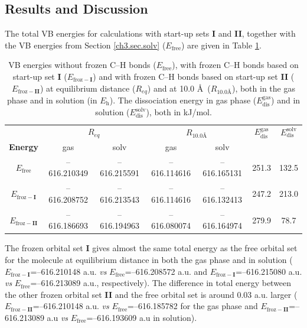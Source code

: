 \subsection{\label{ch3.sec.res.freez}Results and Discussion}

The total VB energies for calculations with start-up sets \textbf{I} and \textbf{II}, together with the VB energies from Section \ref{ch3.sec.solv} ($E_\mathrm{free}$) are given in Table \ref{ch3.tab.frozen}. 
\begin{table}[htp]
\center
\caption{VB energies without frozen C--H bonds ($E_\mathrm{free}$), with frozen C--H bonds based on
start-up set \textbf{I} ($E_\mathrm{froz-\textbf{I}}$) and with frozen C--H bonds based on start-up set \textbf{II}
($E_\mathrm{froz-\textbf{II}}$) at equilibrium distance ($R_{eq}$) and at 10.0 \AA\ ($R_{10.0 \text{\AA}}$),
both in the gas phase and in solution (in $E_\mathrm{h}$). The dissociation energy in gas phase ($E_\mathrm{dis}^\mathrm{gas}$) and in solution ($E_\mathrm{dis}^\mathrm{solv}$), both in kJ/mol.}
\center
\begin{tabular}{|c|cc|cc|c|c|}
\hline
&\multicolumn{2}{c|}{$R_{eq}$}&\multicolumn{2}{c|}{$R_{10.0 \text{\AA}}$} & $E_\mathrm{dis}^\mathrm{gas}$ & $E_\mathrm{dis}^\mathrm{solv}$ \\
\textbf{Energy} & gas & solv & gas & solv &  & \\
\hline
$E_\mathrm{free}$ & {--616.210349} & {--616.215591} & {--616.114616} & {--616.165131} & 251.3 & 132.5 \\
$E_\mathrm{froz-\textbf{I}}$& {--616.208752} & {--616.213543} & {--616.114616} & {--616.132413} & 247.2 &  213.0 \\
$E_\mathrm{froz-\textbf{II}}$& {--616.186693} & {--616.194963} & {--616.080074} & {--616.164974} & 279.9 & 78.7\\
\hline
\end{tabular}
\label{ch3.tab.frozen}
\end{table}

The frozen orbital set \textbf{I} gives almost the same total energy as the free orbital set for the molecule at equilibrium distance in both the gas phase and in solution ($E_{\mathrm{froz}-\textbf{I}}$=--616.210148 a.u. \textit{vs} $E_\mathrm{free}$=--616.208572 a.u. and $E_{\mathrm{froz}-\textbf{I}}$=--616.215080 a.u. \textit{vs} $E_\mathrm{free}$=--616.213089 a.u., respectively). The difference in total energy between the other frozen orbital set \textbf{II} and the free orbital set is around 0.03 a.u. larger ($E_{\mathrm{froz}-\textbf{II}}$=--616.210148 a.u. \textit{vs} $E_\mathrm{free}$=--616.185782 for the gas phase and $E_{\mathrm{froz}-\textbf{II}}$=--616.213089 a.u \textit{vs} $E_\mathrm{free}$=--616.193609 a.u in solution).


